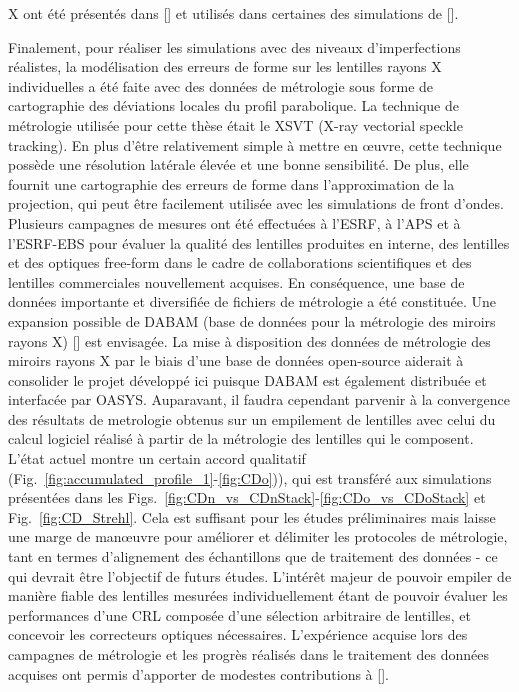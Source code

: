 \begin{refsection}
X ont été présentés dans [\cite{Celestre2020b}] et utilisés dans certaines des simulations de [\cite{Chubar2020}].

Finalement, pour réaliser les simulations avec des niveaux d'imperfections réalistes, la modélisation des erreurs de forme sur les lentilles rayons X individuelles a été faite avec des données de métrologie sous forme de cartographie des déviations locales du profil parabolique. La technique de métrologie utilisée pour cette thèse était le XSVT (X-ray vectorial speckle tracking). En plus d'être relativement simple à mettre en œuvre, cette technique possède une résolution latérale élevée et une bonne sensibilité. De plus, elle fournit une cartographie des erreurs de forme dans l'approximation de la projection, qui peut être facilement utilisée avec les simulations de front d'ondes. 
Plusieurs campagnes de mesures ont été effectuées à l'ESRF, à l'APS et à l'ESRF-EBS pour évaluer la qualité des lentilles produites en interne, des lentilles et des optiques free-form dans le cadre de collaborations scientifiques et des lentilles commerciales nouvellement acquises. En conséquence, une base de données importante et diversifiée de fichiers de métrologie a été constituée. Une expansion possible de DABAM (base de données pour la métrologie des miroirs rayons X) [\cite{SanchezDelRio2016}] est envisagée. La mise à disposition des données de métrologie des miroirs rayons X par le biais d'une base de données open-source aiderait à consolider le projet développé ici puisque DABAM est également distribuée et interfacée par OASYS. Auparavant, il faudra cependant parvenir à la convergence des résultats de metrologie obtenus sur un empilement de lentilles avec celui du calcul logiciel réalisé à partir de la métrologie des lentilles qui le composent. L'état actuel montre un certain accord qualitatif (Fig.~\ref{fig:accumulated_profile_1}-\ref{fig:CDo})), qui est transféré aux simulations présentées dans les Figs.~\ref{fig:CDn_vs_CDnStack}-\ref{fig:CDo_vs_CDoStack} et Fig.~\ref{fig:CD_Strehl}. Cela est suffisant pour les études préliminaires mais laisse une marge de manœuvre pour améliorer et délimiter les protocoles de métrologie, tant en termes d'alignement des échantillons que de traitement des données - ce qui devrait être l'objectif de futurs études. L’intérêt majeur de pouvoir empiler de manière fiable des lentilles mesurées individuellement étant de pouvoir évaluer les performances d'une CRL composée d’une sélection arbitraire de lentilles, et concevoir les correcteurs optiques nécessaires. L'expérience acquise lors des campagnes de métrologie et les progrès réalisés dans le traitement des données acquises ont permis d'apporter de modestes contributions à [\cite{Berujon2020a,Berujon2020,Qiao2020b}].


\end{refsection}
